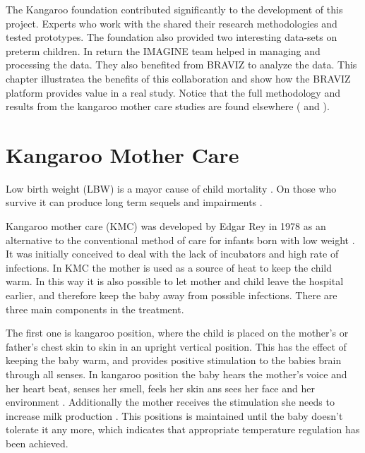 \label{chap_kmc400}



The Kangaroo foundation contributed significantly to the development of this project. Experts who work with the shared their research methodologies and tested prototypes. The foundation also provided two interesting data-sets on preterm children. In return the IMAGINE team helped in managing and processing the data. They also benefited from BRAVIZ to analyze the data. This chapter illustratea the benefits of this collaboration and show how the BRAVIZ platform provides value in a real study. Notice that the full methodology and results from the kangaroo mother care studies are found elsewhere (\autocite{schneider_cerebral_2012} and \autocite{charpak_final_2015}).

\section{Kangaroo Mother Care}

Low birth weight (LBW) is a mayor cause of child mortality \autocite{wardlaw_low_2005}. On those who survive it can produce long term sequels and impairments \autocite{nosarti_neurodevelopmental_2010}. 

Kangaroo mother care (KMC) was developed by Edgar Rey in 1978 \autocite{rey_rational_1983} as an alternative to the conventional method of care for infants born with low weight \autocite{conde-agudelo_kangaroo_2003}. It was initially conceived to deal with the lack of incubators and high rate of infections. In KMC the mother is used as a source of heat to keep the child warm. In this way it is also possible to let mother and child leave the hospital earlier, and therefore keep the baby away from possible infections. There are three main components in the treatment.

The first one is kangaroo position, where the child is placed on the mother's or father's chest skin to skin in an upright vertical position. This has the effect  of keeping the baby warm, and provides positive stimulation to the babies brain through all senses. In kangaroo position the baby hears the mother's voice and her heart beat, senses her smell, feels her skin ans sees her face and her environment \autocite{tessier_kangaroo_2003}. Additionally the mother receives the stimulation she needs to increase milk production \autocite{charpak_kangaroo_2005}. This positions is maintained until the baby doesn't tolerate it any more, which indicates that appropriate temperature regulation has been achieved. 


